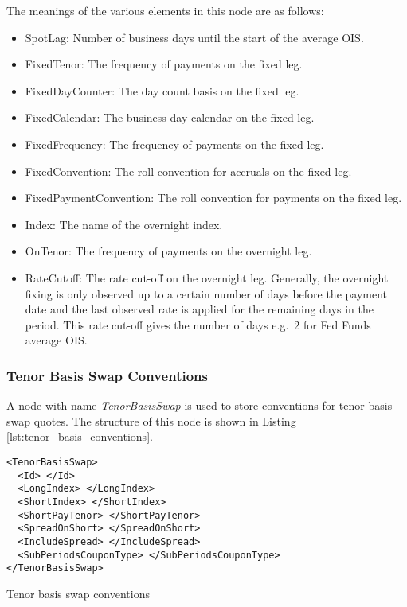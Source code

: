 The meanings of the various elements in this node are as follows:
\begin{itemize}
\item SpotLag: Number of business days until the start of the average OIS.
\item FixedTenor: The frequency of payments on the fixed leg.
\item FixedDayCounter: The day count basis on the fixed leg.
\item FixedCalendar: The business day calendar on the fixed leg.
\item FixedFrequency: The frequency of payments on the fixed leg.
\item FixedConvention: The roll convention for accruals on the fixed leg.
\item FixedPaymentConvention: The roll convention for payments on the fixed leg.
\item Index: The name of the overnight index.
\item OnTenor: The frequency of payments on the overnight leg.
\item RateCutoff: The rate cut-off on the overnight leg. Generally, the overnight fixing is only observed up to a
certain number of days before the payment date and the last observed rate is applied for the remaining days in the
period. This rate cut-off gives the number of days e.g.\ 2 for Fed Funds average OIS.
\end{itemize}

\subsubsection{Tenor Basis Swap Conventions}
A node with name \emph{TenorBasisSwap} is used to store conventions for tenor basis swap quotes. The structure of this 
node is shown in Listing \ref{lst:tenor_basis_conventions}.

\begin{listing}[H]
\begin{verbatim}
<TenorBasisSwap>
  <Id> </Id>
  <LongIndex> </LongIndex>
  <ShortIndex> </ShortIndex>
  <ShortPayTenor> </ShortPayTenor>
  <SpreadOnShort> </SpreadOnShort>
  <IncludeSpread> </IncludeSpread>
  <SubPeriodsCouponType> </SubPeriodsCouponType>
</TenorBasisSwap>
\end{verbatim}
\caption{Tenor basis swap conventions}
\label{lst:tenor_basis_conventions}
\end{listing}


